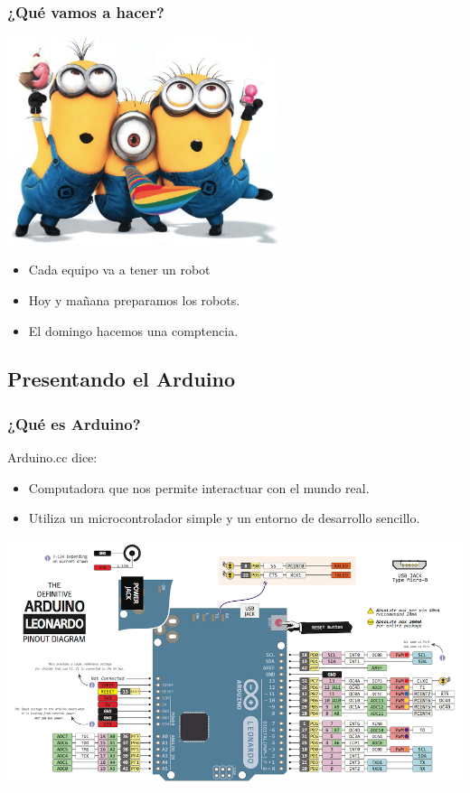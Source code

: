 \documentclass[compress]{beamer}
\begin{document}
\begin{frame}
\begin{center}
\frametitle{¿Qué vamos a hacer?}
\includegraphics[width=0.6\textwidth]{./img/equipo.jpg}

\end{center}
\begin{itemize}
 \item Cada equipo va a tener un robot
 \item Hoy y mañana preparamos los robots.
 \item El domingo hacemos una comptencia.
\end{itemize}

\end{frame}

\subsection{Presentando el Arduino}

\begin{frame}
 \frametitle{¿Qué es Arduino?}
\begin{block}{Arduino.cc dice:} 
\begin{itemize}
 \item Computadora que nos permite interactuar con el mundo real.
 \item Utiliza un microcontrolador simple y un entorno de desarrollo sencillo.
\end{itemize}
\end{block}
\begin{center}
 \includegraphics[height=0.6\textheight]{./img/arduino-leonardo-pinout.png}
\end{center}
\end{frame}
\end{document}
